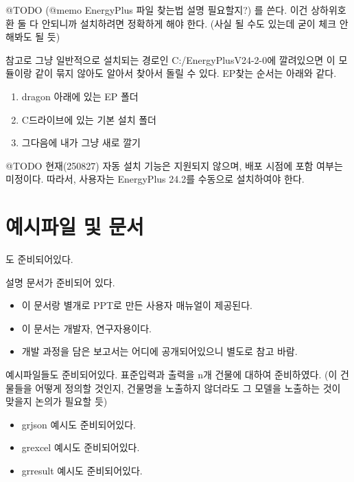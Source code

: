@TODO (@memo EnergyPlus 파일 찾는법 설명 필요할지?)
를 쓴다. 이건 상하위호환 둘 다 안되니까 설치하려면 정확하게 해야 한다. (사실 될 수도 있는데 굳이 체크 안해봐도 될 듯)\par
참고로 그냥 일반적으로 설치되는 경로인 C:/EnergyPlusV24-2-0에 깔려있으면 이 모듈이랑 같이 묶지 않아도 알아서 찾아서 돌릴 수 있다. EP찾는 순서는 아래와 같다.

\begin{enumerate}
  \item dragon 아래에 있는 EP 폴더
  \item C드라이브에 있는 기본 설치 폴더
  \item 그다음에 내가 그냥 새로 깔기
\end{enumerate}

@TODO
현재(250827) 자동 설치 기능은 지원되지 않으며, 배포 시점에 포함 여부는 미정이다. 따라서, 사용자는 EnergyPlus 24.2를 수동으로 설치하여야 한다.


\section{예시파일 및 문서}
도 준비되어있다.

설명 문서가 준비되어 있다.
\begin{itemize}
  \item 이 문서랑 별개로 PPT로 만든 사용자 매뉴얼이 제공된다.
  \item 이 문서는 개발자, 연구자용이다.
  \item 개발 과정을 담은 보고서는 어디에 공개되어있으니 별도로 참고 바람.
\end{itemize}

예시파일들도 준비되어있다. 표준입력과 출력을 n개 건물에 대하여 준비하였다.
(이 건물들을 어떻게 정의할 것인지, 건물명을 노출하지 않더라도 그 모델을 노출하는 것이 맞을지 논의가 필요할 듯)

\begin{itemize}
  \item grjson   예시도 준비되어있다.
  \item grexcel  예시도 준비되어있다.
  \item grresult 예시도 준비되어있다.
\end{itemize}


